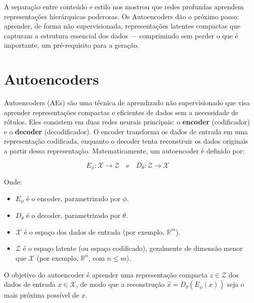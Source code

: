 \documentclass{tufte-handout}
\begin{document}
\medskip
\noindent A separação entre conteúdo e estilo nos mostrou que redes profundas aprendem representações hierárquicas poderosas. Os Autoencoders dão o próximo passo: aprender, de forma não supervisionada, representações latentes compactas que capturam a estrutura essencial dos dados --- comprimindo sem perder o que é importante, um pré-requisito para a geração.

\section{Autoencoders}

Autoencoders (AEs) são uma técnica de aprendizado não supervisionado que visa aprender representações compactas e eficientes de dados sem a necessidade de rótulos. Eles consistem em duas redes neurais principais: o \textbf{encoder} (codificador) e o \textbf{decoder} (decodificador). O encoder transforma os dados de entrada em uma representação codificada, enquanto o decoder tenta reconstruir os dados originais a partir dessa representação. Matematicamente, um autoencoder é definido por:

\begin{equation}
    E_{\phi}: \mathcal{X} \rightarrow \mathcal{Z} \quad \text{e} \quad D_{\theta}: \mathcal{Z} \rightarrow \mathcal{X}
\end{equation}

Onde:
\begin{itemize}
    \item $E_{\phi}$ é o encoder, parametrizado por $\phi$.
    \item $D_{\theta}$ é o decoder, parametrizado por $\theta$.
    \item $\mathcal{X}$ é o espaço dos dados de entrada (por exemplo, $\mathbb{R}^m$).
    \item $\mathcal{Z}$ é o espaço latente (ou espaço codificado), geralmente de dimensão menor que $\mathcal{X}$ (por exemplo, $\mathbb{R}^n$, com $n \leq m$).
\end{itemize}

O objetivo do autoencoder é aprender uma representação compacta $z \in \mathcal{Z}$ dos dados de entrada $x \in \mathcal{X}$, de modo que a reconstrução $\hat{x} = D_{\theta}(E_{\phi}(x))$ seja o mais próxima possível de $x$.
\end{document}
